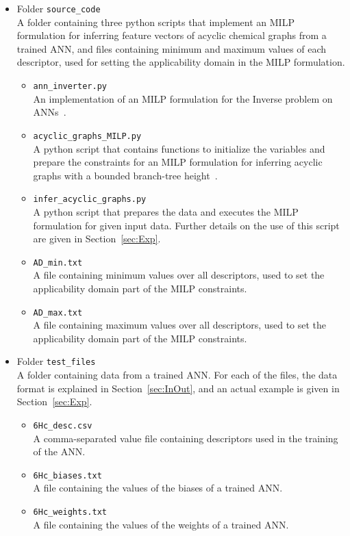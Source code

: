 \documentclass[11pt, titlepage, dvipdfmx, twoside]{article}
\newcommand{\tname}{6Hc}
\begin{document}
\begin{itemize}

\item Folder {\tt source\_code}\\
A folder containing three python scripts that implement
an MILP formulation for inferring feature vectors
of acyclic chemical graphs from a trained ANN,
and files containing minimum and maximum values
of each descriptor, used for setting the applicability domain
in the MILP formulation.

\begin{itemize}

\item {\tt ann\_inverter.py}\\
An implementation of an MILP formulation 
for the Inverse problem on  ANNs~\cite{AN19}.

\item {\tt acyclic\_graphs\_MILP.py}\\
A python script that contains functions to initialize the variables and prepare 
the constraints for an MILP
formulation for inferring acyclic graphs with a bounded branch-tree height~\cite{acyclic_BH}.

\item {\tt infer\_acyclic\_graphs.py}\\
A python script that prepares the data and executes 
the MILP formulation for given input data.
Further details on the use of this script
are given in Section~\ref{sec:Exp}.

\item {\tt AD\_min.txt}\\
A file containing minimum values over all descriptors, 
used to set the applicability domain
part of the MILP constraints.

\item {\tt AD\_max.txt}\\
A file containing maximum values over all descriptors, 
used to set the applicability domain
part of the MILP constraints.
\end{itemize}

\item  Folder {\tt test\_files}\\
A folder containing data from a trained ANN.
For each of the files, the data format is explained in Section~\ref{sec:InOut},
and an actual example is given in Section~\ref{sec:Exp}.
%
\begin{itemize}
\item {\tt \tname\_desc.csv}\\
A comma-separated value file containing descriptors
used in the training of the ANN.

\item {\tt \tname\_biases.txt}\\
A file containing the values of the biases of a trained ANN.

\item {\tt \tname\_weights.txt}\\
A file containing the values of the weights of a trained ANN.

\end{itemize}
\end{itemize}
\end{document}
